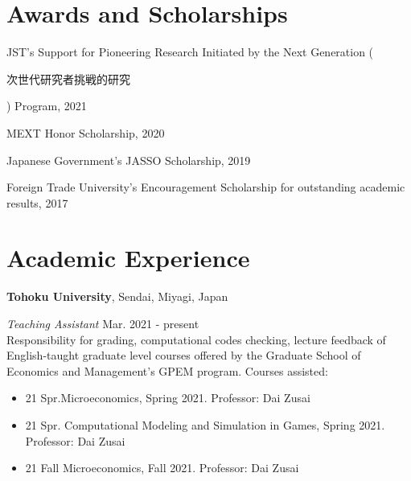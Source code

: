 \documentclass[a4paper,20pt]{article}
\newcommand\textjp[1]{%
	\begin{CJK}{UTF8}{min}#1\end{CJK}}
\begin{document}
	\section{Awards and Scholarships}
	\begin{description}
		\item JST's Support for Pioneering Research Initiated by the Next Generation (\textjp{次世代研究者挑戦的研究}) Program, 2021
		\vspace*{-7pt}
		\item MEXT Honor Scholarship, 2020
		\vspace*{-7pt}
		\item Japanese Government's JASSO Scholarship, 2019
		\vspace*{-7pt}
		\item Foreign Trade University's Encouragement Scholarship for outstanding academic results, 2017
	\end{description}
	
	\vspace{4pt}
	
	\vspace{-5pt}
	\section{Academic Experience}
	
	\textbf{Tohoku University}, Sendai, Miyagi, Japan
	
	\hspace{4mm} \textit{Teaching Assistant} \hfill {Mar. 2021 - present}\\
	\hspace{4mm} Responsibility for grading, computational codes checking, lecture feedback of English-taught graduate level courses offered by the Graduate School of Economics and Management's GPEM program. Courses assisted:
	\vspace*{-7pt}
	\hspace{6mm} \begin{itemize}
		\item 21 Spr.Microeconomics, Spring 2021. Professor: Dai Zusai
		\vspace*{-7pt}
		\item 21 Spr. Computational Modeling and Simulation in Games, Spring 2021. Professor: Dai Zusai
		\vspace*{-7pt}
		\item 21 Fall Microeconomics, Fall 2021. Professor: Dai Zusai
	\end{itemize}
	
\end{document}
